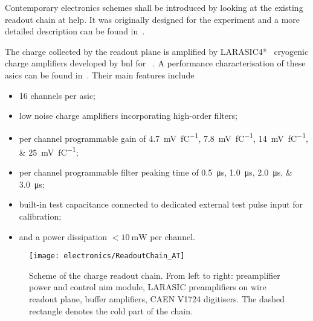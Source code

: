 Contemporary electronics schemes shall be introduced by looking at the existing readout chain at \gls{help}.
It was originally designed for the \AT{} experiment and a more detailed description can be found in~\cite{AT_larasic}.

The charge collected by the readout plane is amplified by LARASIC4*~\cite{larasic} cryogenic charge amplifiers developed by \gls{bnl} for \uboone{}~\cite{uboone}.
A performance characterisation of these \glspl{asic} can be found in~\cite{AT_larasic}.
Their main features include

\begin{itemize}
	\item \num{16} channels per \gls{asic};
	\item low noise charge amplifiers incorporating high-order filters;
	\item per channel programmable gain of \SIlist[list-final-separator = {, or }]{4.7; 7.8; 14; 25}{\milli\volt\per\femto\coulomb};
	\item per channel programmable filter peaking time of \SIlist[list-final-separator = {, or }]{0.5; 1.0; 2.0; 3.0}{\micro\second};
	\item built-in test capacitance connected to dedicated external test pulse input for calibration;
	\item and a power dissipation $< \SI{10}{\milli\watt}$ per channel.
\end{itemize}

\begin{figure}[htb]
	\centering
	\texttt{[image: electronics/ReadoutChain\_AT]}
	\caption[\AT{} charge readout chain]{%
		Scheme of the \AT{} charge readout chain.
		From left to right: preamplifier power and control \acrshort{nim} module, LARASIC preamplifiers on wire readout plane, buffer amplifiers, CAEN V1724 digitisers.
		The dashed rectangle denotes the cold part of the chain.~\cite{AT_larasic}
	}
	\label{fig:viper_readoutChain_AT}
\end{figure}

